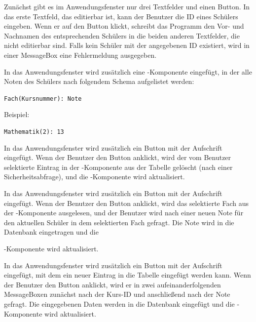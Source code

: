 \begin{compactenum}[a)]
\item Zunächst gibt es im Anwendungsfenster nur drei Textfelder und einen
Button. In das erste Textfeld, das editierbar ist, kann der Benutzer die ID
eines Schülers eingeben. Wenn er auf den Button klickt, schreibt das Programm
den Vor- und Nachnamen des entsprechenden Schülers in die beiden anderen
Textfelder, die nicht editierbar sind. Falls kein Schüler mit der angegebenen
ID existiert, wird in einer MessageBox eine Fehlermeldung ausgegeben.

\item In das Anwendungsfenster wird zusätzlich eine
-Komponente eingefügt, in der alle Noten des Schülers nach
folgendem Schema aufgelistet werden:

\lstinline|Fach(Kursnummer): Note|

Beispiel:

\lstinline|Mathematik(2): 13|

\item In das Anwendungsfenster wird zusätzlich ein Button mit der Aufschrift
 eingefügt. Wenn der Benutzer den Button anklickt, wird der
vom Benutzer selektierte Eintrag in der -Komponente aus der
Tabelle  gelöscht (nach einer Sicherheitsabfrage), und die
-Komponente wird aktualisiert.

\item In das Anwendungsfenster wird zusätzlich ein Button mit der Aufschrift
 eingefügt. Wenn der Benutzer den Button anklickt, wird
das selektierte Fach aus der -Komponente ausgelesen, und der
Benutzer wird nach einer neuen Note für den aktuellen Schüler in dem
selektierten Fach gefragt. Die Note wird in die Datenbank eingetragen und die

-Komponente wird aktualisiert.

\item In das Anwendungsfenster wird zusätzlich ein Button mit der Aufschrift
 eingefügt, mit dem ein neuer Eintrag in die Tabelle
 eingefügt werden kann. Wenn der Benutzer den Button anklickt,
wird er in zwei aufeinanderfolgenden MessageBoxen zunächst nach der Kurs-ID und
anschließend nach der Note gefragt. Die eingegebenen Daten werden in die
Datenbank eingefügt und die -Komponente wird aktualisiert.
\end{compactenum}


